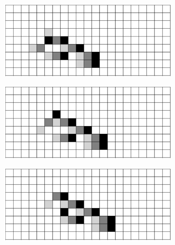 \documentclass[12pt]{article}
\numberwithin{figure}{section} %
\begin{document}
\begin{figure}[H]
\begin{subfigure}{0.45\textwidth}
     		\subcaption{}
   	\end{subfigure}
    	\begin{subfigure}{0.45\textwidth}
     		\includegraphics[width=\linewidth]{Section4/35.3}
     		\subcaption{}
   	\end{subfigure}
	\newline
	\begin{subfigure}{0.45\textwidth}
     		\includegraphics[width=\linewidth]{Section4/35.4}
     		\subcaption{}
   	\end{subfigure}
    	\begin{subfigure}{0.45\textwidth}
     		\includegraphics[width=\linewidth]{Section4/35.5}
     		\subcaption{}

\end{subfigure}
\end{figure}
\end{document}
